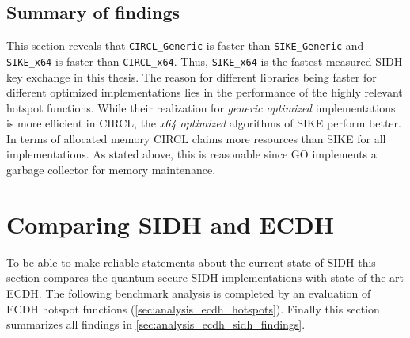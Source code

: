 \subsection{Summary of findings}\label{sec:sike_circl_findings}

This section reveals that \texttt{CIRCL\_Generic} is faster than  \texttt{SIKE\_Generic} and \texttt{SIKE\_x64} is faster than \texttt{CIRCL\_x64}. Thus, \texttt{SIKE\_x64} is the fastest measured \gls{SIDH} key exchange in this thesis. The reason for different libraries being faster for different optimized implementations lies in the performance of the highly relevant hotspot functions. While their realization for \textit{generic optimized} implementations is more efficient in \gls{CIRCL}, the \textit{x64 optimized} algorithms of \gls{SIKE} perform better. \\
In terms of allocated memory  \gls{CIRCL} claims more resources than \gls{SIKE} for all implementations. As stated above, this is reasonable since GO implements a garbage collector for memory maintenance.

\section{Comparing \gls{SIDH} and \gls{ECDH}} \label{sec:analysis_effiency_ecdh}

To be able to make reliable statements about the current state of \gls{SIDH} this section compares the quantum-secure \gls{SIDH} implementations with state-of-the-art \gls{ECDH}. The following benchmark analysis is completed by an evaluation of \gls{ECDH} hotspot functions (\autoref{sec:analysis_ecdh_hotspots}). Finally this section summarizes all findings in \autoref{sec:analysis_ecdh_sidh_findings}.\\


